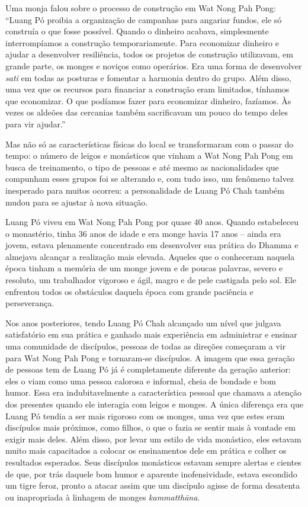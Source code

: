 Uma monja falou sobre o processo de construção em Wat Nong Pah Pong:
``Luang Pó proibia a organização de campanhas para angariar fundos, ele
só construía o que fosse possível. Quando o dinheiro acabava,
simplesmente interrompíamos a construção temporariamente. Para
economizar dinheiro e ajudar a desenvolver resiliência, todos os
projetos de construção utilizavam, em grande parte, os monges e noviços
como operários. Era uma forma de desenvolver \emph{sati} em todas as
posturas e fomentar a harmonia dentro do grupo. Além disso, uma vez que
os recursos para financiar a construção eram limitados, tínhamos que
economizar. O que podíamos fazer para economizar dinheiro, fazíamos. Às
vezes os aldeões das cercanias também sacrificavam um pouco do tempo
deles para vir ajudar.''

Mas não só as características físicas do local se transformaram com o
passar do tempo: o número de leigos e monásticos que vinham a Wat Nong
Pah Pong em busca de treinamento, o tipo de pessoas e até mesmo as
nacionalidades que compunham esses grupos foi se alterando e, com tudo
isso, um fenômeno talvez inesperado para muitos ocorreu: a personalidade
de Luang Pó Chah também mudou para se ajustar à nova situação.

Luang Pó viveu em Wat Nong Pah Pong por quase 40 anos. Quando
estabeleceu o monastério, tinha 36 anos de idade e era monge havia 17
anos -- ainda era jovem, estava plenamente concentrado em desenvolver
sua prática do Dhamma e almejava alcançar a realização mais elevada.
Aqueles que o conheceram naquela época tinham a memória de um monge
jovem e de poucas palavras, severo e resoluto, um trabalhador vigoroso e
ágil, magro e de pele castigada pelo sol. Ele enfrentou todos os
obstáculos daquela época com grande paciência e perseverança.

Nos anos posteriores, tendo Luang Pó Chah alcançado um nível que julgava
satisfatório em sua prática e ganhado mais experiência em administrar e
ensinar uma comunidade de discípulos, pessoas de todas as direções
começaram a vir para Wat Nong Pah Pong e tornaram-se discípulos. A
imagem que essa geração de pessoas tem de Luang Pó já é completamente
diferente da geração anterior: eles o viam como uma pessoa calorosa e
informal, cheia de bondade e bom humor. Essa era indubitavelmente a
característica pessoal que chamava a atenção dos presentes quando ele
interagia com leigos e monges. A única diferença era que Luang Pó tendia
a ser mais rigoroso com os monges, uma vez que estes eram discípulos
mais próximos, como filhos, o que o fazia se sentir mais à vontade em
exigir mais deles. Além disso, por levar um estilo de vida monástico,
eles estavam muito mais capacitados a colocar os ensinamentos dele em
prática e colher os resultados esperados. Seus discípulos monásticos
estavam sempre alertas e cientes de que, por trás daquele bom humor e
aparente inofensividade, estava escondido um tigre feroz, pronto a
atacar assim que um discípulo agisse de forma desatenta ou inapropriada
à linhagem de monges \emph{kammatthāna}.

